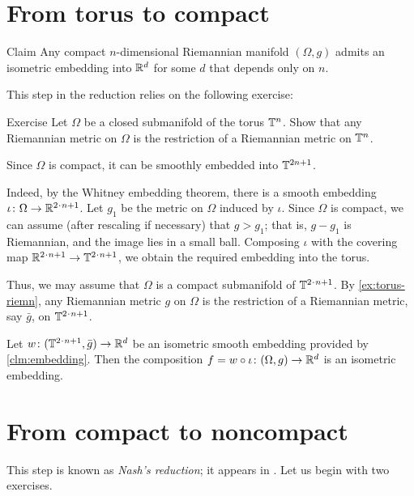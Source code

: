\section{From torus to compact}\label{thm:compact}

\begin{thm}{Claim}\label{clm:compact}
Any compact $n$-dimensional Riemannian manifold $(\Omega,g)$ admits an isometric embedding into $\mathbb{R}^d$ for some $d$ that depends only on $n$.
\end{thm}

This step in the reduction relies on the following exercise:

\begin{thm}{Exercise}\label{ex:torus-riemn}
Let $\Omega$ be a closed submanifold of the torus $\mathbb{T}^n$.
Show that any Riemannian metric on $\Omega$ is the restriction of a Riemannian metric on $\mathbb{T}^n$.
\end{thm}

Since $\Omega$ is compact, it can be smoothly embedded into $\mathbb{T}^{2n+1}$.

Indeed, by the Whitney embedding theorem, there is a smooth embedding $\iota\:\Omega\z\to \RR^{2\cdot n+1}$.
Let $g_1$ be the metric on $\Omega$ induced by $\iota$.
Since $\Omega$ is compact, we can assume (after rescaling if necessary) that $g>g_1$; that is, $g-g_1$ is Riemannian, and the image lies in a small ball.
Composing $\iota$ with the covering map $\RR^{2\cdot n+1}\to \TT^{2\cdot n+1}$, we obtain the required embedding into the torus.

Thus, we may  assume that $\Omega$ is a compact submanifold of $\TT^{2\cdot n+1}$.
By \ref{ex:torus-riemn}, any Riemannian metric $g$ on $\Omega$ is the restriction of a Riemannian metric, say $\bar g$, on $\TT^{2\cdot n+1}$.

Let $w\: (\TT^{2\cdot n+1}, \bar g) \to \RR^d$ be an isometric smooth embedding provided by \ref{clm:embedding}.
Then the composition $f = w \circ \iota\colon(\Omega, g) \to \mathbb{R}^d$ is an isometric embedding.
\qeds

\section{From compact to noncompact}\label{sec:compact>noncompact}

This step is known as \emph{Nash's reduction};
it appears in \cite[Part D]{nash-1956}.
Let us begin with two exercises.

